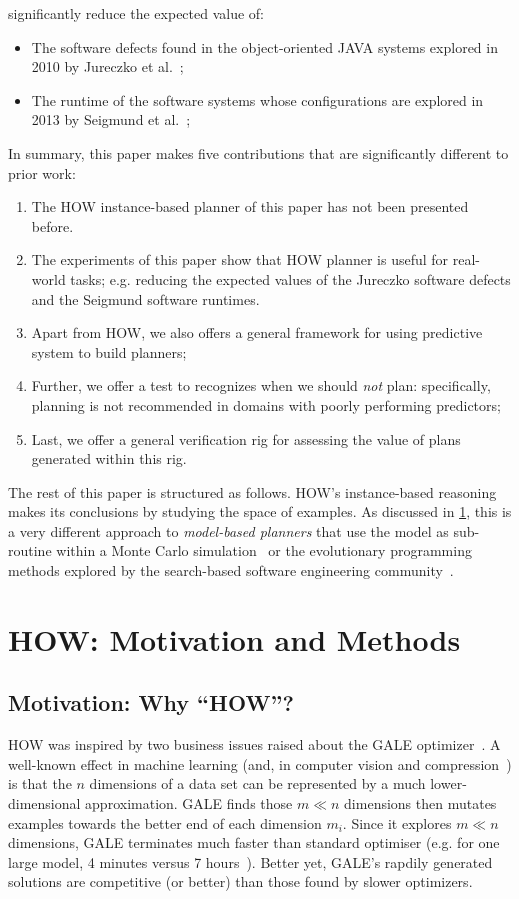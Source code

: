 \documentclass[conference]{IEEEtran}
\newcommand{\bi}{\begin{itemize}}
\newcommand{\ei}{\end{itemize}}
\newcommand{\be}{\begin{enumerate}}
\newcommand{\ee}{\end{enumerate}}
\newcommand{\tion}[1]{\textsection\ref{sec:#1}}
\begin{document}
significantly reduce the expected
value of:
\bi
\item The software defects found in  the object-oriented JAVA systems explored in 2010 by Jureczko et al.~\cite{jureczko10};
\item The runtime of the  software systems whose configurations
are explored in 2013 by Seigmund et al.~\cite{sven12};
\ei
In summary, this paper makes five contributions that are significantly different to
prior work:
\be
\item The HOW  instance-based planner of this paper has not been presented before.
\item The experiments of this paper show that HOW planner is useful for real-world tasks;
e.g. reducing the
expected values of the Jureczko software defects and the Seigmund software runtimes.
\item Apart from HOW, we  also offers a general framework for using  predictive system to build planners;
\item Further, we offer a  test to recognizes  when we should {\em not}  plan: specifically,
planning is
not recommended in domains with  poorly performing predictors;
\item Last, we  offer a general verification rig for assessing the value of plans generated within this rig.
\ee
The rest of this paper is structured as follows.
HOW's instance-based reasoning  makes its conclusions by
studying the space of examples. As discussed in \tion{mm},
this is a very different approach to
{\em model-based planners} that use the model
as sub-routine within a Monte Carlo simulation~\cite{me07f} or the evolutionary 
programming methods explored by the search-based software
engineering community~\cite{krall14,harman12dec}.  
 
 

\section{HOW: Motivation and Methods}\label{sec:mm}
 
 \subsection{Motivation: Why ``HOW''?}
HOW was inspired by two     business issues raised about the  GALE optimizer~\cite{krall14}. 
A well-known effect in machine learning (and, in computer vision
and compression~\cite{levina04}) is that the $n$ dimensions of a data set can be represented by a  much
lower-dimensional approximation. GALE finds those $m \ll n$ dimensions then mutates examples
towards the better end of each dimension $m_i$. Since it explores $m \ll n$ dimensions,
GALE terminates much faster than standard optimiser (e.g. for one large model, 4 minutes versus 7 hours~\cite{krall14}).
Better yet, GALE's rapdily generated  solutions are competitive (or better) than those found by 
slower optimizers.
\end{document}
